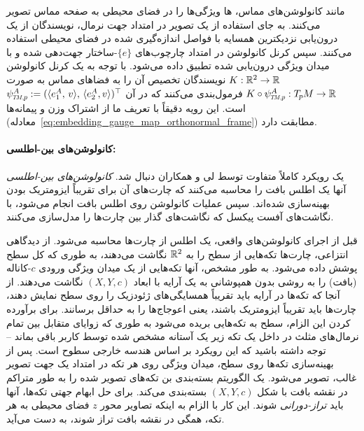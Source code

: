 مانند کانولوشن‌های مماس، ها ویژگی‌ها را در فضای محیطی به صفحه مماس تصویر می‌کنند.
به جای استفاده از یک تصویر در امتداد جهت نرمال، نویسندگان از یک درون‌یابی نزدیکترین همسایه با فواصل اندازه‌گیری شده در فضای محیطی استفاده می‌کنند.
سپس کرنل کانولوشن در امتداد چارچوب‌های $\{e\}$-ساختار جهت‌دهی شده و با میدان ویژگی درون‌یابی شده تطبیق داده می‌شود.
با توجه به یک کرنل کانولوشن $K: \mathbb{R}^2 \to \mathbb{R}$ نویسندگان تخصیص آن را به فضاهای مماس به صورت $K \circ \psiTMp^A: \TpM \to \R$ فرمول‌بندی می‌کنند که در آن $\psiTMp^A := (\langle e_1^A,\,v\rangle,\, \langle e_2^A,v\rangle )^\top$ است.
این رویه دقیقاً با تعریف ما از اشتراک وزن و پیمانه‌ها (معادله~\eqref{eq:embedding_gauge_map_orthonormal_frame}) مطابقت دارد.








\paragraph{کانولوشن‌های بین-اطلسی:}
یک رویکرد کاملاً متفاوت توسط لی و همکاران\cite{li2019crossAtlas} دنبال شد.
\emph{کانولوشن‌های بین-اطلسی} آنها یک اطلس بافت را محاسبه می‌کنند که چارت‌های آن برای تقریباً ایزومتریک بودن بهینه‌سازی شده‌اند.
سپس عملیات کانولوشن روی اطلس بافت انجام می‌شود، با نگاشت‌های آفست پیکسل که نگاشت‌های گذار بین چارت‌ها را مدل‌سازی می‌کنند.

قبل از اجرای کانولوشن‌های واقعی، یک اطلس از چارت‌ها محاسبه می‌شود.
از دیدگاهی انتزاعی، چارت‌ها تکه‌هایی از سطح را به $\mathbb{R}^2$ نگاشت می‌دهند، به طوری که کل سطح پوشش داده می‌شود.
به طور مشخص، آنها تکه‌هایی از یک میدان ویژگی ورودی $c$-کاناله (بافت) را به روشی بدون همپوشانی به یک آرایه با ابعاد $(X,Y,c)$ نگاشت می‌دهند.
از آنجا که تکه‌ها در آرایه باید تقریباً همسایگی‌های ژئودزیک را روی سطح نمایش دهند، چارت‌ها باید تقریباً ایزومتریک باشند، یعنی اعوجاج‌ها را به حداقل برسانند.
برای برآورده کردن این الزام، سطح به تکه‌هایی بریده می‌شود به طوری که زوایای متقابل بین تمام نرمال‌های مثلث در داخل یک تکه زیر یک آستانه مشخص شده توسط کاربر باقی بماند -- توجه داشته باشید که این رویکرد بر اساس هندسه خارجی سطوح است.
پس از بهینه‌سازی تکه‌ها روی سطح، میدان ویژگی روی هر تکه در امتداد یک جهت تصویر غالب، تصویر می‌شود.
یک الگوریتم بسته‌بندی بن  تکه‌های تصویر شده را به طور متراکم در نقشه بافت با شکل $(X,Y,c)$ بسته‌بندی می‌کند.
برای حل ابهام جهتی تکه‌ها، آنها باید \emph{تراز-دورانی} شوند.
این کار با الزام به اینکه تصاویر محور $z$ فضای محیطی به هر تکه، همگی در نقشه بافت تراز شوند، به دست می‌آید.

